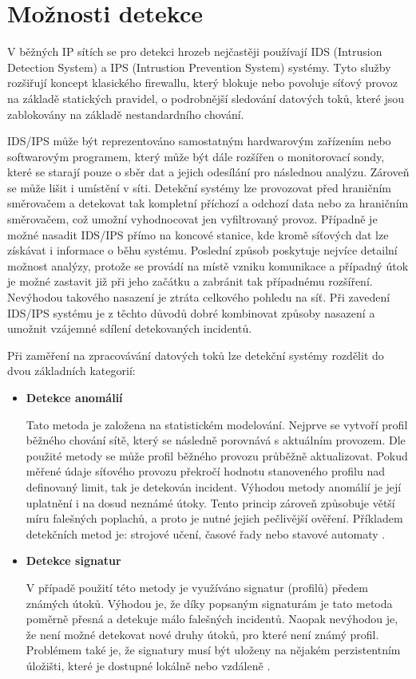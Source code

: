  \newpage
 \section{Možnosti detekce}
 V běžných IP sítích se pro detekci hrozeb nejčastěji používají IDS (Intrusion Detection System) a
 IPS (Intrustion Prevention System) systémy. Tyto služby rozšiřují koncept klasického firewallu, který
 blokuje nebo povoluje síťový provoz na základě statických pravidel, o podrobnější sledování 
 datových toků, které jsou zablokovány na základě nestandardního chování.
 
 IDS/IPS může být reprezentováno samostatným hardwarovým zařízením nebo softwarovým programem, který
 může být dále rozšířen o monitorovací sondy, které se starají pouze o sběr dat a jejich odesílání
 pro následnou analýzu. Zároveň
 se může lišit i umístění v síti. Detekční systémy lze provozovat před hraničním směrovačem 
 a detekovat tak kompletní příchozí a odchozí data nebo za hraničním směrovačem, což 
 umožní vyhodnocovat jen vyfiltrovaný provoz. Případně je možné nasadit IDS/IPS přímo na koncové
 stanice, kde kromě síťových dat lze získávat i informace o běhu systému. Poslední způsob poskytuje
 nejvíce detailní možnost analýzy, protože se provádí na místě vzniku komunikace a případný útok
 je možné zastavit již při jeho začátku a zabránit tak případnému rozšíření. Nevýhodou takového nasazení
 je ztráta celkového pohledu na síť. Při zavedení IDS/IPS systému je z těchto důvodů dobré 
 kombinovat způsoby nasazení a umožnit vzájemné sdílení detekovaných incidentů.
 
 Při zaměření na zpracovávání datových toků lze detekční systémy rozdělit do dvou základních kategorií:
 \begin{itemize}
  \item \textbf{Detekce anomálií}
  
  Tato metoda je založena na statistickém modelování. Nejprve se vytvoří profil běžného chování sítě, 
  který se následně porovnává s aktuálním provozem. Dle použité metody se může profil běžného provozu
  průběžně aktualizovat. Pokud měřené údaje síťového provozu překročí hodnotu stanoveného profilu
  nad definovaný limit, tak je detekován incident. Výhodou metody anomálií je její uplatnění i na 
  dosud neznámé útoky. Tento princip zároveň způsobuje větší míru falešných poplachů, a proto 
  je nutné jejich pečlivější ověření. Příkladem detekčních metod je: strojové učení, časové řady nebo
  stavové automaty \cite{ids-ips}.
  
  \item \textbf{Detekce signatur}
  
  V případě použití této metody je využíváno signatur (profilů) předem známých útoků. Výhodou je, že díky 
  popsaným signaturám je tato metoda poměrně přesná a detekuje málo falešných incidentů. Naopak
  nevýhodou je, že není možné detekovat nové druhy útoků, pro které není známý profil. Problémem
  také je, že signatury musí být uloženy na nějakém perzistentním úložišti, které je dostupné 
  lokálně nebo vzdáleně \cite{ids-ips}.
 \end{itemize}
 
